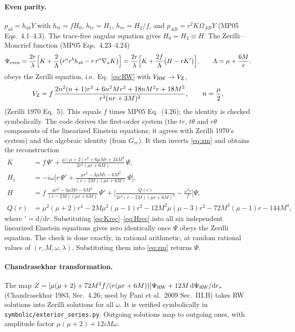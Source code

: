 \documentclass[11pt,a4paper]{article}
\numberwithin{equation}{section}
\newcommand{\dd}{\mathrm{d}}
\begin{document}
\paragraph{Even parity.} $p_{ab}=h_{ab}Y$ with $h_{tt}=fH_0$, $h_{tr}=H_1$, $h_{rr}=H_2/f$, and
$p_{AB}=r^2K\Omega_{AB}Y$ (MP05 Eqs.~4.1--4.3). The trace-free angular equation gives $H_0=H_2\equiv H$. The
Zerilli--Moncrief function (MP05 Eqs.~4.23--4.24)
\begin{equation}
\Psi_{\rm even}=\frac{2r}{\lambda}\Big[K+\frac{2}{\Lambda}\big(r^ar^bh_{ab}-r\,r^a\nabla_aK\big)\Big]
=\frac{2r}{\lambda}\Big[K+\frac{2f}{\Lambda}\big(H-rK'\big)\Big],\qquad\Lambda=\mu+\frac{6M}{r},
\label{eq:zm}
\end{equation}
obeys the Zerilli equation, i.e.\ Eq.~\eqref{eq:RW} with $V_{\rm RW}\to V_{\rm Z}$,
\begin{equation}
V_{\rm Z}=f\,\frac{2n^2(n+1)r^3+6n^2Mr^2+18nM^2r+18M^3}{r^3(nr+3M)^2},\qquad n=\frac{\mu}{2},
\label{eq:VZ}
\end{equation}
(Zerilli 1970 Eq.~5). This equals $f$ times MP05 Eq.~(4.26); the identity is checked symbolically. The code
derives the first-order system (the $tr$, $t\theta$ and $r\theta$ components of the linearized Einstein
equations; it agrees with Zerilli 1970's system) and the algebraic identity (from $G_{rr}$). It then inverts
\eqref{eq:zm} and obtains the reconstruction
\begin{align}
K&=f\,\Psi'+\frac{\mu(\mu+2)r^2+6\mu Mr+24M^2}{2r^2(\mu r+6M)}\,\Psi,\label{eq:Krec}\\
H_1&=-i\omega\Big[r\,\Psi'+\frac{\mu r^2-3\mu Mr-6M^2}{(r-2M)(\mu r+6M)}\,\Psi\Big],\label{eq:H1rec}\\
H&=f\,\frac{\mu r^2-3\mu Mr-6M^2}{(r-2M)(\mu r+6M)}\,\Psi'
+\Big[\frac{Q(r)}{2r^2(r-2M)(\mu r+6M)^2}-\frac{\omega^2r}{f}\Big]\Psi,\label{eq:Hrec}\\
Q(r)&=\mu^2(\mu+2)r^4-2M\mu^2(\mu-1)r^3-12M^2\mu(\mu-3)r^2-72M^3(\mu-1)r-144M^4,\nonumber
\end{align}
where $'=\dd/\dd r$. Substituting \eqref{eq:Krec}--\eqref{eq:Hrec} into all six independent linearized Einstein
equations gives zero identically once $\Psi$ obeys the Zerilli equation. The check is done exactly, in
rational arithmetic, at random rational values of $(r,M,\omega,\lambda)$. Substituting them into
\eqref{eq:zm} returns $\Psi$.

\paragraph{Chandrasekhar transformation.} The map
$Z=[\mu(\mu+2)+72M^2f/(r(\mu r+6M))]\Psi_{\rm RW}+12M\,\dd\Psi_{\rm RW}/\dd r_*$ (Chandrasekhar 1983,
Sec.~4.26; used by Pani et al.\ 2009 Sec.~III.B) takes RW solutions into Zerilli solutions for all $\omega$. It
is verified symbolically in \texttt{symbolic/exterior\_series.py}. Outgoing solutions map to outgoing ones,
with amplitude factor $\mu(\mu+2)+12iM\omega$.
\end{document}
